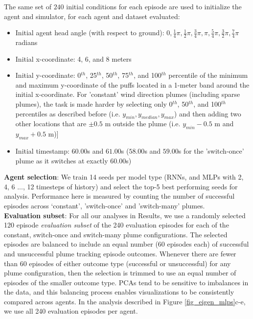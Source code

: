 \documentclass[5p,twocolumn,authoryear]{elsarticle}
\begin{document}
The same set of $240$ initial conditions for each episode are used to initialize the agent and simulator, for each agent and dataset evaluated: 
\begin{itemize}
    \item Initial agent head angle (with respect to ground): $0, \frac{1}{4}\pi, \frac{1}{2}\pi, \frac{3}{4}\pi, \pi, \frac{5}{4}\pi, \frac{3}{2}\pi, \frac{7}{4}\pi$ radians
    \item Initial x-coordinate: 4, 6, and 8 meters
    \item Initial y-coordinate: 0$^{th}$, 25$^{th}$, 50$^{th}$, 75$^{th}$, and 100$^{th}$ percentile of the minimum and maximum y-coordinate of the puffs located in a 1-meter band around the initial x-coordinate. 
    For 'constant'  wind direction plumes (including sparse plumes), the task is made harder by selecting only 0$^{th}$, 50$^{th}$, and 100$^{th}$ percentiles as described before (i.e. $y_{min}, y_{median}, y_{max}$) and then adding two other locations that are $\pm 0.5$ m outside the plume (i.e. $y_{min} - 0.5$ m and $y_{max} + 0.5$ m)]
    \item Initial timestamp: $60.00$s and $61.00$s ($58.00$s and $59.00$s for the 'switch-once' plume as it switches at exactly $60.00$s)
\end{itemize}

\textbf{Agent selection}:  We train 14 seeds per model type (RNNs, and MLPs with 2, 4, 6 ..., 12 timesteps of history) and select the top-5 best performing seeds for analysis.
Performance here is measured by counting the number of successful episodes across `constant', 'switch-once' and 'switch-many' plumes. \\ 

\textbf{Evaluation subset}: For all our analyses in Results, we use a randomly selected 120 episode \textit{evaluation subset} of the 240 evaluation episodes for each of the constant, switch-once and switch-many plume configurations.
The selected episodes are balanced to include an equal number (60 episodes each) of successful and unsuccessful plume tracking episode outcomes.
Whenever there are fewer than 60 episodes of either outcome type (successful or unsuccessful) for any plume configuration, then the selection is trimmed to use an equal number of episodes of the smaller outcome type.
PCAs tend to be sensitive to imbalances in the data, and this balancing process enables visualizations to be consistently compared across agents.  
In the analysis described in Figure \ref{fig_eigen_mlps}c-e, we use all 240 evaluation episodes per agent. \\
\end{document}
